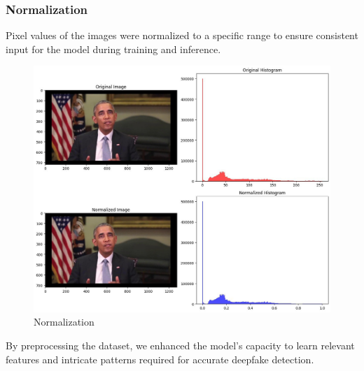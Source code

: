 \subsubsection{Normalization} Pixel values of the images were normalized to a specific range to ensure consistent input for the model during training and inference.

\begin{figure}[htbp]
    \centering
    \includegraphics[width=5in]{img/normalized.jpg}
    \caption{Normalization}
\end{figure}

By preprocessing the dataset, we enhanced the model's capacity to learn relevant features and intricate patterns required for accurate deepfake detection.
\newpage